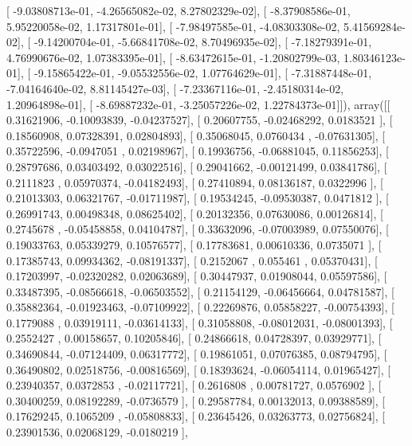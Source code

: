 \documentclass{article}
\begin{document}
       [ -9.03808713e-01,  -4.26565082e-02,   8.27802329e-02],
       [ -8.37908586e-01,   5.95220058e-02,   1.17317801e-01],
       [ -7.98497585e-01,  -4.08303308e-02,   5.41569284e-02],
       [ -9.14200704e-01,  -5.66841708e-02,   8.70496935e-02],
       [ -7.18279391e-01,   4.76990676e-02,   1.07383395e-01],
       [ -8.63472615e-01,  -1.20802799e-03,   1.80346123e-01],
       [ -9.15865422e-01,  -9.05532556e-02,   1.07764629e-01],
       [ -7.31887448e-01,  -7.04164640e-02,   8.81145427e-03],
       [ -7.23367116e-01,  -2.45180314e-02,   1.20964898e-01],
       [ -8.69887232e-01,  -3.25057226e-02,   1.22784373e-01]]), array([[ 0.31621906, -0.10093839, -0.04237527],
       [ 0.20607755, -0.02468292,  0.0183521 ],
       [ 0.18560908,  0.07328391,  0.02804893],
       [ 0.35068045,  0.0760434 , -0.07631305],
       [ 0.35722596, -0.0947051 ,  0.02198967],
       [ 0.19936756, -0.06881045,  0.11856253],
       [ 0.28797686,  0.03403492,  0.03022516],
       [ 0.29041662, -0.00121499,  0.03841786],
       [ 0.2111823 ,  0.05970374, -0.04182493],
       [ 0.27410894,  0.08136187,  0.0322996 ],
       [ 0.21013303,  0.06321767, -0.01711987],
       [ 0.19534245, -0.09530387,  0.0471812 ],
       [ 0.26991743,  0.00498348,  0.08625402],
       [ 0.20132356,  0.07630086,  0.00126814],
       [ 0.2745678 , -0.05458858,  0.04104787],
       [ 0.33632096, -0.07003989,  0.07550076],
       [ 0.19033763,  0.05339279,  0.10576577],
       [ 0.17783681,  0.00610336,  0.0735071 ],
       [ 0.17385743,  0.09934362, -0.08191337],
       [ 0.2152067 ,  0.055461  ,  0.05370431],
       [ 0.17203997, -0.02320282,  0.02063689],
       [ 0.30447937,  0.01908044,  0.05597586],
       [ 0.33487395, -0.08566618, -0.06503552],
       [ 0.21154129, -0.06456664,  0.04781587],
       [ 0.35882364, -0.01923463, -0.07109922],
       [ 0.22269876,  0.05858227, -0.00754393],
       [ 0.1779088 ,  0.03919111, -0.03614133],
       [ 0.31058808, -0.08012031, -0.08001393],
       [ 0.2552427 ,  0.00158657,  0.10205846],
       [ 0.24866618,  0.04728397,  0.03929771],
       [ 0.34690844, -0.07124409,  0.06317772],
       [ 0.19861051,  0.07076385,  0.08794795],
       [ 0.36490802,  0.02518756, -0.00816569],
       [ 0.18393624, -0.06054114,  0.01965427],
       [ 0.23940357,  0.0372853 , -0.02117721],
       [ 0.2616808 ,  0.00781727,  0.0576902 ],
       [ 0.30400259,  0.08192289, -0.0736579 ],
       [ 0.29587784,  0.00132013,  0.09388589],
       [ 0.17629245,  0.1065209 , -0.05808833],
       [ 0.23645426,  0.03263773,  0.02756824],
       [ 0.23901536,  0.02068129, -0.0180219 ],
\end{document}
